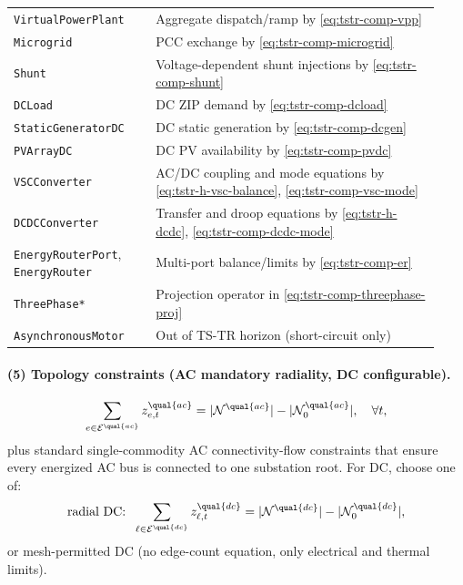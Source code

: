 {\begin{longtable}{L{0.31\linewidth}L{0.62\linewidth}}
\texttt{VirtualPowerPlant} & Aggregate dispatch/ramp by \eqref{eq:tstr-comp-vpp} \\
\texttt{Microgrid} & PCC exchange by \eqref{eq:tstr-comp-microgrid} \\
\texttt{Shunt} & Voltage-dependent shunt injections by \eqref{eq:tstr-comp-shunt} \\
\texttt{DCLoad} & DC ZIP demand by \eqref{eq:tstr-comp-dcload} \\
\texttt{StaticGeneratorDC} & DC static generation by \eqref{eq:tstr-comp-dcgen} \\
\texttt{PVArrayDC} & DC PV availability by \eqref{eq:tstr-comp-pvdc} \\
\texttt{VSCConverter} & AC/DC coupling and mode equations by \eqref{eq:tstr-h-vsc-balance}, \eqref{eq:tstr-comp-vsc-mode} \\
\texttt{DCDCConverter} & Transfer and droop equations by \eqref{eq:tstr-h-dcdc}, \eqref{eq:tstr-comp-dcdc-mode} \\
\texttt{EnergyRouterPort}, \texttt{EnergyRouter} & Multi-port balance/limits by \eqref{eq:tstr-comp-er} \\
\texttt{ThreePhase*} & Projection operator in \eqref{eq:tstr-comp-threephase-proj} \\
\texttt{AsynchronousMotor} & Out of TS-TR horizon (short-circuit only) \\
\bottomrule
\end{longtable}
}

\paragraph{(5) Topology constraints (AC mandatory radiality, DC configurable).}
\begin{align}
\sum_{e\in\mathcal{E}^{\qual{ac}}} z^{\qual{ac}}_{e,t}
= |\mathcal{N}^{\qual{ac}}|-|\mathcal{N}^{\qual{ac}}_0|,
\quad \forall t,
\label{eq:tstr-h-ac-edge-count}
\end{align}
plus standard single-commodity AC connectivity-flow constraints that ensure
every energized AC bus is connected to one substation root.
For DC, choose one of:
\begin{align}
\text{radial DC: }\;
\sum_{\ell\in\mathcal{E}^{\qual{dc}}} z^{\qual{dc}}_{\ell,t}
=|\mathcal{N}^{\qual{dc}}|-|\mathcal{N}^{\qual{dc}}_0|,
\label{eq:tstr-h-dc-radial}
\end{align}
or mesh-permitted DC (no edge-count equation, only electrical and thermal limits).

